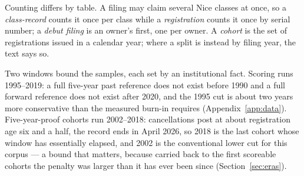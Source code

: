 Counting differs by table. A filing may claim several Nice classes at
once, so a \emph{class-record} counts it once per class while a
\emph{registration} counts it once by serial number; a \emph{debut
filing} is an owner's first, one per owner. A \emph{cohort} is the set of
registrations issued in a calendar year; where a split is instead by
filing year, the text says so.

Two windows bound the samples, each set by an institutional fact. Scoring
runs 1995--2019: a full five-year past reference does not exist before
1990 and a full forward reference does not exist after 2020, and the 1995
cut is about two years more conservative than the measured burn-in
requires (Appendix~\ref{app:data}). Five-year-proof cohorts run
2002--2018: cancellations post at about registration age six and a half,
the record ends in April 2026, so 2018 is the last cohort whose window
has essentially elapsed, and 2002 is the conventional lower cut for this
corpus --- a bound that matters, because carried back to the first
scoreable cohorts the penalty was larger than it has ever been since
(Section~\ref{sec:eras}).

